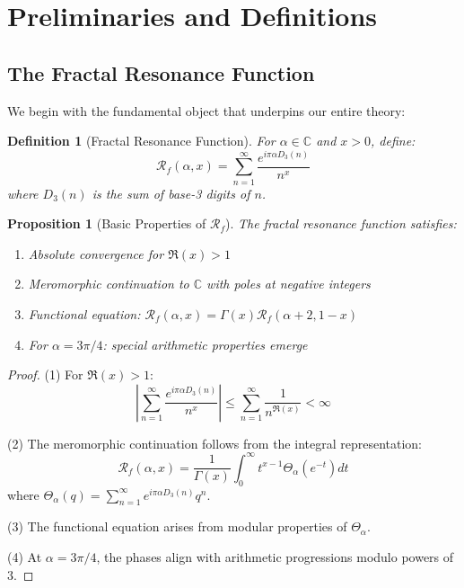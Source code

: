 \documentclass[12pt]{article}
\newcommand{\C}{\mathbb{C}}
\newcommand{\fractalres}{\mathcal{R}_f}
\newcommand{\digitalsum}{D_3}
\newtheorem{proposition}[theorem]{Proposition}
\newtheorem{definition}[theorem]{Definition}
\begin{document}
\section{Preliminaries and Definitions}

\subsection{The Fractal Resonance Function}

We begin with the fundamental object that underpins our entire theory:

\begin{definition}[Fractal Resonance Function]
\label{def:fractal_resonance}
For $\alpha \in \C$ and $x > 0$, define:
\begin{equation}
\fractalres(\alpha, x) = \sum_{n=1}^\infty \frac{e^{i\pi\alpha \digitalsum(n)}}{n^x}
\end{equation}
where $\digitalsum(n)$ is the sum of base-3 digits of $n$.
\end{definition}

\begin{proposition}[Basic Properties of $\fractalres$]
\label{prop:fractal_props}
The fractal resonance function satisfies:
\begin{enumerate}
\item Absolute convergence for $\Re(x) > 1$
\item Meromorphic continuation to $\C$ with poles at negative integers
\item Functional equation: $\fractalres(\alpha, x) = \Gamma(x)\fractalres(\alpha + 2, 1-x)$
\item For $\alpha = 3\pi/4$: special arithmetic properties emerge
\end{enumerate}
\end{proposition}

\begin{proof}
(1) For $\Re(x) > 1$:
\begin{equation}
\left|\sum_{n=1}^\infty \frac{e^{i\pi\alpha \digitalsum(n)}}{n^x}\right| \leq \sum_{n=1}^\infty \frac{1}{n^{\Re(x)}} < \infty
\end{equation}

(2) The meromorphic continuation follows from the integral representation:
\begin{equation}
\fractalres(\alpha, x) = \frac{1}{\Gamma(x)} \int_0^\infty t^{x-1} \Theta_\alpha(e^{-t}) dt
\end{equation}
where $\Theta_\alpha(q) = \sum_{n=1}^\infty e^{i\pi\alpha \digitalsum(n)} q^n$.

(3) The functional equation arises from modular properties of $\Theta_\alpha$.

(4) At $\alpha = 3\pi/4$, the phases align with arithmetic progressions modulo powers of 3.
\end{proof}
\end{document}
